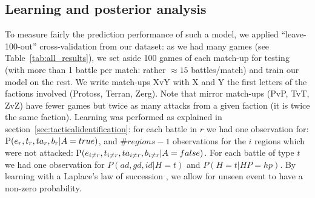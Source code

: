 \subsection{Learning and posterior analysis}
To measure fairly the prediction performance of such a model, we applied ``leave-100-out'' cross-validation from our dataset: as we had many games (see Table~\ref{tab:all_results}), we set aside 100 games of each match-up for testing (with more than 1 battle per match: rather $\approx 15$ battles/match) and train our model on the rest. We write match-ups XvY with X and Y the first letters of the factions involved (Protoss, Terran, Zerg). Note that mirror match-ups (PvP, TvT, ZvZ) have fewer games but twice as many attacks from a given faction (it is twice the same faction). Learning was performed as explained in section~\ref{sec:tacticalidentification}: for each battle in $r$ we had one observation for: $\mathrm{P}(e_r,t_r,ta_r,b_r|A=true)$, and $\#regions-1$ observations for the $i$ regions which were not attacked: $\mathrm{P}(e_{i \neq r},t_{i \neq r}, ta_{i \neq r}, b_{i \neq r}|A=false)$. For each battle of type $t$ we had one observation for $P(ad,gd,id|H=t)$ and $P(H=t|HP=hp)$. By learning with a Laplace's law of succession \cite{Jaynes}, we allow for unseen event to have a non-zero probability.

